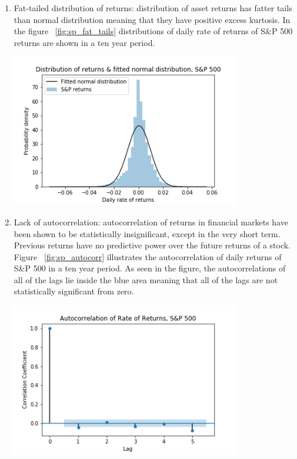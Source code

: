 \begin{enumerate}
    \item Fat-tailed distribution of returns: distribution of asset returns has fatter tails than normal distribution meaning that they have positive excess kurtosis. 
          In the figure  ~\ref{fig:sp_fat_tails} distributions of daily rate of returns of S\&P 500 returns are shown in a ten year period.
    \par
    \begin{minipage}{\linewidth}
        \centering
        \includegraphics[width=10cm]{plots/S&P500_fat_tails.png}
        \label{fig:sp_fat_tails}
    \end{minipage}
    \item Lack of autocorrelation: autocorrelation of returns in financial markets have been shown to be statistically insignificant, except in the very short term. 
          Previous returns have no predictive power over the future returns of a stock. 
          Figure ~\ref{fig:sp_autocorr} illustrates the autocorrelation of daily returns of S\&P 500 in a ten year period.
          As seen in the figure, the autocorrelations of all of the lags lie inside the blue area meaning that all of the lags 
          are not statistically significant from zero.
    \par
    \begin{minipage}{\linewidth}
        \centering
        \includegraphics[width=10cm]{plots/S&P500_autocorr.png}

\end{minipage}
\end{enumerate}
